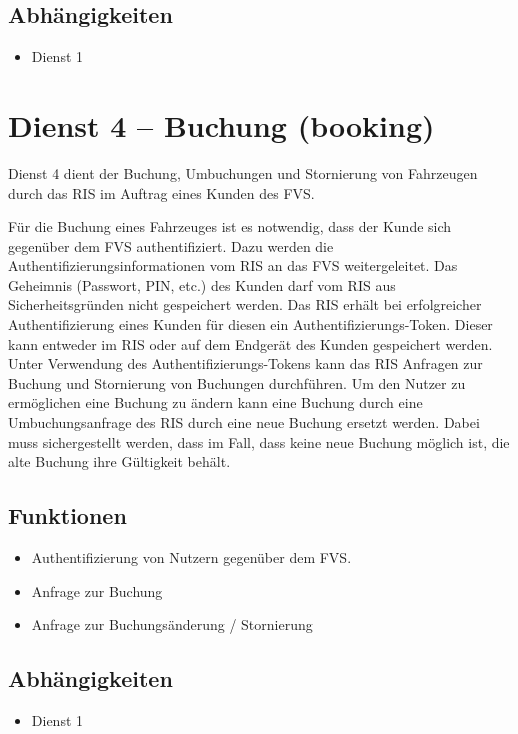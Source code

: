\subsection*{Abhängigkeiten}
\begin{itemize}
\item Dienst 1
\end{itemize}


\section{Dienst 4 -- Buchung (booking)}
Dienst 4 dient der Buchung, Umbuchungen und Stornierung von Fahrzeugen durch das RIS im Auftrag eines Kunden des FVS.

Für die Buchung eines Fahrzeuges ist es notwendig, dass der Kunde sich gegenüber dem FVS authentifiziert. Dazu werden die Authentifizierungsinformationen vom RIS an das FVS weitergeleitet. Das Geheimnis (Passwort, PIN, etc.) des Kunden darf vom RIS aus Sicherheitsgründen nicht gespeichert werden. Das RIS erhält bei erfolgreicher Authentifizierung eines Kunden für diesen ein Authentifizierungs-Token. Dieser kann entweder im RIS oder auf dem Endgerät des Kunden gespeichert werden. Unter Verwendung des Authentifizierungs-Tokens kann das RIS Anfragen zur Buchung und Stornierung von Buchungen durchführen. 
Um den Nutzer zu ermöglichen eine Buchung zu ändern kann eine Buchung durch eine Umbuchungsanfrage des RIS durch eine neue Buchung ersetzt werden. Dabei muss sichergestellt werden, dass im Fall, dass keine neue Buchung möglich ist, die alte Buchung ihre Gültigkeit behält.

\subsection*{Funktionen}
\begin{itemize}
\item Authentifizierung von Nutzern gegenüber dem FVS.
\item Anfrage zur Buchung
\item Anfrage zur Buchungsänderung / Stornierung
\end{itemize}

\subsection*{Abhängigkeiten}
\begin{itemize}
\item Dienst 1
\end{itemize}

